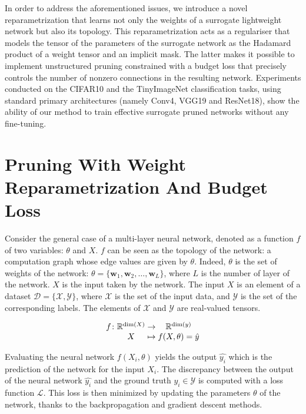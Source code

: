 In order to address the aforementioned issues, we introduce a novel
reparametrization that learns not only the weights of a surrogate lightweight
network but also its topology. This reparametrization acts as a regulariser that
models the tensor of the parameters of the surrogate network as the Hadamard
product of a weight tensor and an implicit mask. The latter makes it possible to
implement unstructured pruning constrained with a budget loss that precisely
controls the number of nonzero connections in the resulting network. Experiments
conducted on the CIFAR10 and the TinyImageNet classification tasks, using
standard primary architectures (namely Conv4, VGG19 and ResNet18), show the
ability of our method to train effective surrogate pruned networks without any
fine-tuning.


\section{Pruning With Weight Reparametrization And Budget Loss}
Consider the general case of a multi-layer neural network, denoted as a function
$f$ of two variables: $\theta$ and $X$. $f$ can be seen as the topology of the
network: a computation graph whose edge values are given by $\theta$. Indeed,
$\theta$ is the set of weights of the network: $\theta = \{\mathbf{w}_1,
\mathbf{w}_2, \ldots, \mathbf{w}_L\}$, where $L$ is the number of layer of the
network. $X$ is the input taken by the network. The input $X$ is an element of a
dataset $\mathcal{D}=\{ \mathcal{X}, \mathcal{Y} \}$, where $\mathcal{X}$ is the
set of the input data, and $\mathcal{Y}$ is the set of the corresponding labels.
The elements of $\mathcal{X}$ and $\mathcal{Y}$ are real-valued tensors.

\begin{equation}
    \begingroup
  \setlength\arraycolsep{0pt}
  f \colon\begin{array}[t]{c >{{}}c<{{}} c}
             \mathbb{R}^{\dim (X)} & \to & \mathbb{R}^{\dim (y)} \\ 
             X & \mapsto & f(X, \theta) = \hat{y} 
          \end{array}
  \endgroup
\end{equation}

Evaluating the neural network $f(X_i, \theta)$ yields the output $\hat{y_i}$
which is the prediction of the network for the input $X_i$. The discrepancy
between the output of the neural network $\hat{y_i}$ and the ground truth $y_i
\in \mathcal{Y}$ is computed with a loss function $\mathcal{L}$.  This loss is
then minimized by updating the parameters $\theta$ of the network, thanks to the
backpropagation \cite{rumelhart1985learning,rumelhart1986learning} and gradient
descent methods.\\

